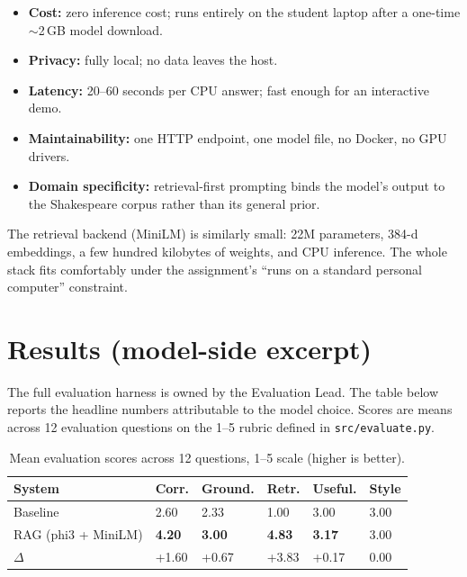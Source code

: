 \documentclass[10pt,twocolumn,a4paper]{article}
\begin{document}
\begin{itemize}
    \item \textbf{Cost:} zero inference cost; runs entirely on the
        student laptop after a one-time $\sim$2\,GB model download.
    \item \textbf{Privacy:} fully local; no data leaves the host.
    \item \textbf{Latency:} 20--60 seconds per CPU answer; fast
        enough for an interactive demo.
    \item \textbf{Maintainability:} one HTTP endpoint, one model
        file, no Docker, no GPU drivers.
    \item \textbf{Domain specificity:} retrieval-first prompting
        binds the model's output to the Shakespeare corpus rather
        than its general prior.
\end{itemize}

The retrieval backend (MiniLM) is similarly small: 22M parameters,
384-d embeddings, a few hundred kilobytes of weights, and CPU
inference. The whole stack fits comfortably under the assignment's
``runs on a standard personal computer'' constraint.

\section{Results (model-side excerpt)}
\label{sec:results}

The full evaluation harness is owned by the Evaluation Lead. The
table below reports the headline numbers attributable to the model
choice. Scores are means across 12 evaluation questions on the 1--5
rubric defined in \verb|src/evaluate.py|.

\begin{table}[h]
\centering
\caption{Mean evaluation scores across 12 questions, 1--5 scale
(higher is better).}
\label{tab:evaluation-summary}
\begin{tabularx}{\linewidth}{lXXXXX}
\toprule
System & Corr. & Ground. & Retr. & Useful. & Style \\
\midrule
Baseline                   & 2.60 & 2.33 & 1.00 & 3.00 & 3.00 \\
RAG (phi3 + MiniLM)        & \textbf{4.20} & \textbf{3.00} & \textbf{4.83} & \textbf{3.17} & 3.00 \\
\midrule
$\Delta$                   & +1.60 & +0.67 & +3.83 & +0.17 & 0.00 \\
\bottomrule
\end{tabularx}
\end{table}
\end{document}

